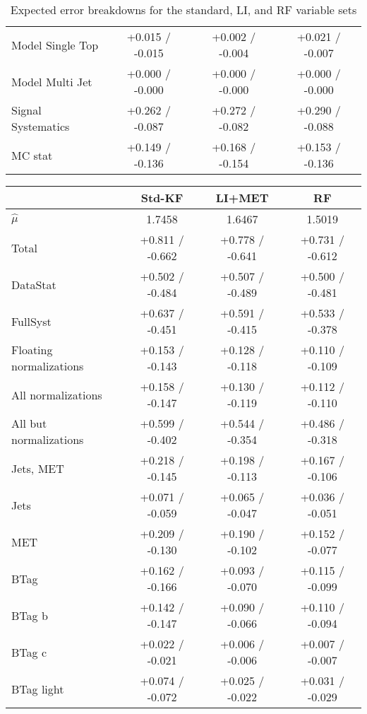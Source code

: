 \begin{table}[!htbp]
\begin{center}
\begin{tabular}{lccc}
Model Single Top &  +0.015 / -0.015  &  +0.002 / -0.004  &  +0.021 / -0.007 \\
Model Multi Jet &  +0.000 / -0.000  &  +0.000 / -0.000  &  +0.000 / -0.000 \\
Signal Systematics &  +0.262 / -0.087  &  +0.272 / -0.082  &  +0.290 / -0.088 \\
MC stat &  +0.149 / -0.136  &  +0.168 / -0.154  &  +0.153 / -0.136 \\
\hline\hline
\end{tabular}
\end{center}
\caption{Expected error breakdowns for the standard, LI, and RF variable sets}
\label{tab:breakdownexp}
\end{table}

\begin{table}[!htbp]
\begin{center}
\begin{tabular}{lccc}
\hline\hline
 &Std-KF &LI+MET &RF\\
\hline
$\hat{\mu}$ & 1.7458 & 1.6467 & 1.5019\\
\hline
Total &  +0.811 / -0.662  &  +0.778 / -0.641  &  +0.731 / -0.612 \\
\hline
DataStat &  +0.502 / -0.484  &  +0.507 / -0.489  &  +0.500 / -0.481 \\
FullSyst &  +0.637 / -0.451  &  +0.591 / -0.415  &  +0.533 / -0.378 \\
Floating normalizations &  +0.153 / -0.143  &  +0.128 / -0.118  &  +0.110 / -0.109 \\
All normalizations &  +0.158 / -0.147  &  +0.130 / -0.119  &  +0.112 / -0.110 \\
All but normalizations &  +0.599 / -0.402  &  +0.544 / -0.354  &  +0.486 / -0.318 \\
\hline
Jets, MET &  +0.218 / -0.145  &  +0.198 / -0.113  &  +0.167 / -0.106 \\
Jets &  +0.071 / -0.059  &  +0.065 / -0.047  &  +0.036 / -0.051 \\
MET &  +0.209 / -0.130  &  +0.190 / -0.102  &  +0.152 / -0.077 \\
BTag &  +0.162 / -0.166  &  +0.093 / -0.070  &  +0.115 / -0.099 \\
BTag b &  +0.142 / -0.147  &  +0.090 / -0.066  &  +0.110 / -0.094 \\
BTag c &  +0.022 / -0.021  &  +0.006 / -0.006  &  +0.007 / -0.007 \\
BTag light &  +0.074 / -0.072  &  +0.025 / -0.022  &  +0.031 / -0.029 \\

\end{tabular}
\end{center}
\end{table}
